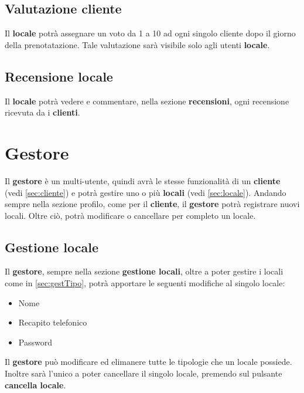 \subsection{Valutazione cliente} \label{sec:valCliente}
Il \textbf{locale} potrà assegnare un voto da 1 a 10 ad ogni singolo cliente dopo il giorno della prenotatazione. Tale valutazione
sarà visibile solo agli utenti \textbf{locale}.

\subsection{Recensione locale} \label{sec:valCliente}
Il \textbf{locale} potrà vedere e commentare, nella sezione \textbf{recensioni}, ogni recensione ricevuta da i
\textbf{clienti}.

\section*{Gestore}
Il \textbf{gestore} è un multi-utente, quindi avrà le stesse funzionalità di un \textbf{cliente} (vedi 
\ref{sec:cliente}) e potrà gestire uno o più \textbf{locali} (vedi \ref{sec:locale}). Andando sempre nella sezione profilo,
come per il \textbf{cliente}, il \textbf{gestore} potrà registrare nuovi locali. Oltre ciò, potrà modificare o
cancellare per completo un locale.

\subsection{Gestione locale} 
Il \textbf{gestore}, sempre nella sezione \textbf{gestione locali}, oltre a poter gestire i locali come in
\ref{sec:gestTipo}, potrà apportare le seguenti modifiche al singolo locale:
\begin{itemize}
    \item Nome
    \item Recapito telefonico
    \item Password
\end{itemize}
Il \textbf{gestore} può modificare ed elimanere tutte le tipologie che un locale possiede. Inoltre sarà l'unico a poter
cancellare il singolo locale, premendo sul pulsante \textbf{cancella locale}.